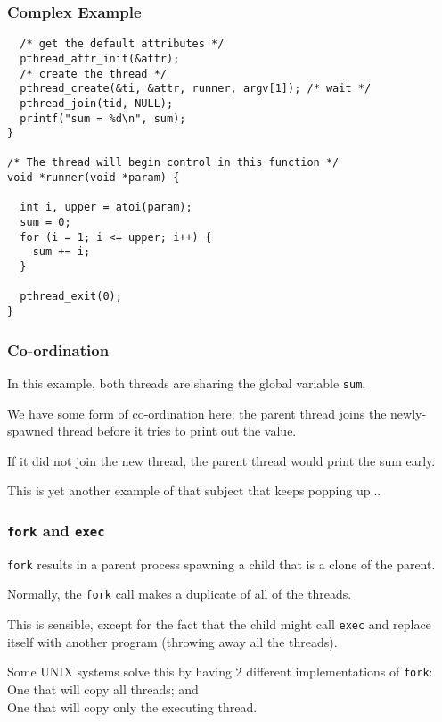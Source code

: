 \begin{frame}[fragile]
\frametitle{Complex Example}

\begin{verbatim}
  /* get the default attributes */
  pthread_attr_init(&attr);
  /* create the thread */
  pthread_create(&ti, &attr, runner, argv[1]); /* wait */
  pthread_join(tid, NULL); 
  printf("sum = %d\n", sum);
}

/* The thread will begin control in this function */ 
void *runner(void *param) {

  int i, upper = atoi(param);
  sum = 0;
  for (i = 1; i <= upper; i++) {
    sum += i;
  }
  
  pthread_exit(0);
}
\end{verbatim}


\end{frame}



\begin{frame}
\frametitle{Co-ordination}

In this example, both threads are sharing the global variable \texttt{sum}. 

We have some form of co-ordination here: the parent thread joins the newly-spawned thread before it tries to print out the value. 

If it did not join the new thread, the parent thread would print the sum early. 

This is yet another example of that subject that keeps popping up...

\end{frame}



\begin{frame}
\frametitle{\texttt{fork} and \texttt{exec}}

\texttt{fork} results in a parent process spawning a child that is a clone of the parent.

Normally, the \texttt{fork} call makes a duplicate of all of the threads.

This is sensible, except for the fact that the child might call \texttt{exec} and replace itself with another program (throwing away all the threads). 

Some UNIX systems solve this by having 2 different implementations of \texttt{fork}:\\ \quad One that will copy all threads; and\\
\quad One that will copy only the executing thread.


\end{frame}


